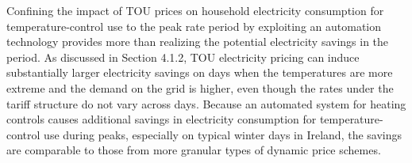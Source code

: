 Confining the impact of TOU prices on household electricity consumption for temperature-control use to the peak rate period by exploiting an automation technology provides more than realizing the potential electricity savings in the period. As discussed in Section 4.1.2, TOU electricity pricing can induce substantially larger electricity savings on days when the temperatures are more extreme and the demand on the grid is higher, even though the rates under the tariff structure do not vary across days. Because an automated system for heating controls causes additional savings in electricity consumption for temperature-control use during peaks, especially on typical winter days in Ireland, the savings are comparable to those from more granular types of dynamic price schemes. 

